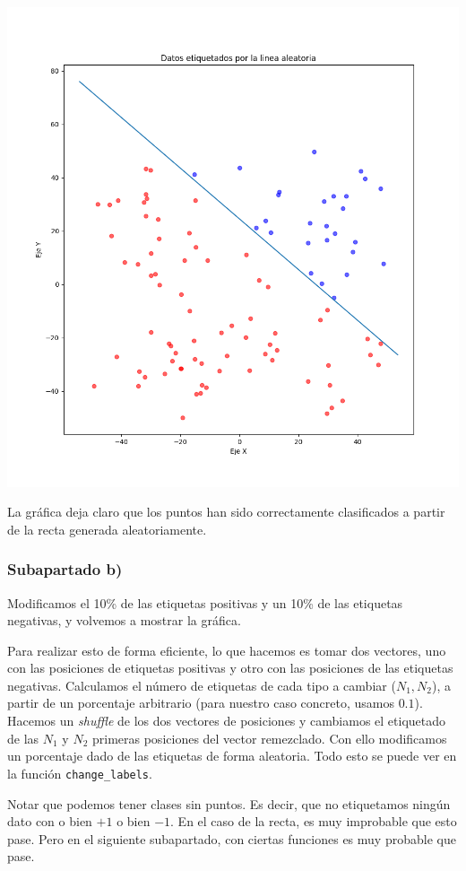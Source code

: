 \documentclass[11pt]{article}
\begin{document}
\includegraphics[width=0.9 \textwidth]{puntos_clasificados_recta01}

La gráfica deja claro que los puntos han sido correctamente clasificados a partir de la recta generada aleatoriamente.

\subsubsection{Subapartado b)} \label{section:ejercicio1.2.b}

Modificamos el 10\% de las etiquetas positivas y un 10\% de las etiquetas negativas, y volvemos a mostrar la gráfica.

Para realizar esto de forma eficiente, lo que hacemos es tomar dos vectores, uno con las posiciones de etiquetas positivas y otro con las posiciones de las etiquetas negativas. Calculamos el número de etiquetas de cada tipo a cambiar ($N_1, N_2$), a partir de un porcentaje arbitrario (para nuestro caso concreto, usamos $0.1$). Hacemos un \emph{shuffle} de los dos vectores de posiciones y cambiamos el etiquetado de las $N_1$ y $N_2$ primeras posiciones del vector remezclado. Con ello modificamos un porcentaje dado de las etiquetas de forma aleatoria. Todo esto se puede ver en la función \lstinline{change_labels}.

Notar que podemos tener clases sin puntos. Es decir, que no etiquetamos ningún dato con o bien $+1$ o bien $-1$. En el caso de la recta, es muy improbable que esto pase. Pero en el siguiente subapartado, con ciertas funciones es muy probable que pase.
\end{document}
